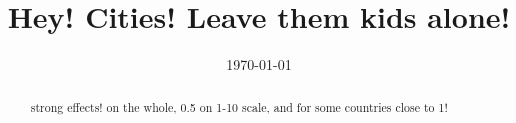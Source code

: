 \documentclass[10pt, letterpaper]{article}
\date{{}\today \hspace{.2in}\xxivtime}
\title{  %
  Hey! Cities! Leave them kids alone!
}
\author{
}
\begin{document}


\maketitle
\vspace{-.4in}
\begin{center}

\end{center}


\begin{abstract}
\noindent strong effects! on the whole, 0.5 on 1-10 scale, and for some countries close to 1!
\end{abstract}
\vspace{.15in} 
\noindent{\sc %
}
\vspace{.25in} 
\end{document}
